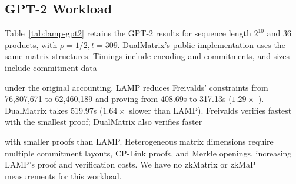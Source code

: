 \documentclass[conference,compsoc]{IEEEtran}
\makeatletter
\newif\ifshowrevisions
\newenvironment{revblock}[1][]
  {%
    \ifshowrevisions
      \begin{tcolorbox}[
        breakable,
        colback=revisionyellow,
        colframe=revisionyellow,
        boxrule=0pt,
        arc=0pt,
        left=2pt,
        right=2pt,
        top=2pt,
        bottom=2pt,
        before skip=2pt,
        after skip=2pt,
        #1
      ]
    \fi
  }
  {%
    \ifshowrevisions
      \end{tcolorbox}
    \fi
  }
\newcommand{\protocol}{\textsf{LAMP}}   %
\theoremstyle{plain}
\theoremstyle{definition}
\theoremstyle{remark}
\providecommand{\DIFaddtex}[1]{{\protect\color{blue}\uwave{#1}}} %
\providecommand{\DIFdeltex}[1]{{\protect\color{red}\sout{#1}}} %
\providecommand{\DIFaddbegin}{} %
\providecommand{\DIFaddend}{} %
\providecommand{\DIFdelbegin}{} %
\providecommand{\DIFdelend}{} %
\providecommand{\DIFadd}[1]{\texorpdfstring{\DIFaddtex{#1}}{#1}} %
\providecommand{\DIFdel}[1]{\texorpdfstring{\DIFdeltex{#1}}{}} %
\let\sout@orig\sout %
\renewcommand{\sout}[1]{\ifmmode\text{\sout@orig{\ensuremath{#1}}}\else\sout@orig{#1}\fi} %
\renewcommand{\DIFaddtex}[1]{{\protect\color{DiffBlue}#1}}
\renewcommand{\DIFdeltex}[1]{}
\makeatother
\begin{document}
\subsection[GPT-2 Workload]
  {GPT-2 Workload}
\label{sec:eval-gpt2}

\begin{revblock}
Table~\ref{tab:lamp-gpt2} \DIFdelbegin \DIFdel{reports the results for a GPT-2 layer with }\DIFdelend \DIFaddbegin \DIFadd{retains the GPT-2 results for }\DIFaddend sequence length
\(2^{10}\) and 36 \DIFdelbegin \DIFdel{matrix-multiplication claims. In this experiment, \(\protocol\) uses \(\rho=1/2\) and \(t=309\). As in
Section~\ref{sec:eval-matmul-comparison}, proving times }\DIFdelend \DIFaddbegin \DIFadd{products, with \(\rho=1/2,t=309\). DualMatrix's public
implementation uses the same matrix structures. Timings }\DIFaddend include encoding and
\DIFdelbegin \DIFdel{commitment generation, and proof }\DIFdelend \DIFaddbegin \DIFadd{commitments, and }\DIFaddend sizes include commitment data \DIFdelbegin \DIFdel{.
For DualMatrix, we configure the inputs of its public implementation to match
the GPT-2 matrix structures and evaluate the same matrix multiplications.
}%

\DIFdel{Compared with the Freivalds baseline, \(\protocol\) reduces the constraint
count from \(76{,}807{,}671\) to }%
\DIFdel{and the proving
time from \(408.69\) s to }%
\DIFdel{s , yielding a }\DIFdelend \DIFaddbegin \DIFadd{under the original accounting.
LAMP reduces Freivalds' constraints from 76,807,671 to 62,460,189 and proving
from 408.69s to 317.13s (}\DIFaddend \(1.29\times\)\DIFdelbegin \DIFdel{speedup. DualMatrix requires \(519.97\) s
, so \(\protocol\) is }%
\DIFdel{faster and has the
shortest proving time among the three systems. In contrast, the
Freivalds baseline provides the fastest verification and smallest
proof, while
}\DIFdelend \DIFaddbegin \DIFadd{). DualMatrix takes 519.97s
(\(1.64\times\) slower than LAMP). Freivalds verifies fastest with the smallest
proof; }\DIFaddend DualMatrix also verifies faster \DIFdelbegin \DIFdel{and produces a smaller proof than \(\protocol\).
}%

\DIFdel{The relatively large proof size of \(\protocol\) in the GPT-2 experiment stems
from the different dimensions of the matrices involved in the workload. These
matrix multiplications }\DIFdelend \DIFaddbegin \DIFadd{with smaller proofs than LAMP.
Heterogeneous matrix dimensions }\DIFaddend require multiple commitment layouts\DIFdelbegin \DIFdel{and corresponding
}\DIFdelend \DIFaddbegin \DIFadd{, }\DIFaddend CP-Link
proofs\DIFdelbegin \DIFdel{and Merkle membership proofs. These linking and membership
proofs---dominated in size by the Merkle openings---therefore account for a
substantial portion of the total proof and are the main source of proof-size
growth in heterogeneous workloads such as GPT-2.
}\DIFdelend \DIFaddbegin \DIFadd{, and Merkle openings, increasing LAMP's proof and verification costs.
We have no zkMatrix or zkMaP measurements for this workload.
}\DIFaddend \end{revblock}
\end{document}
